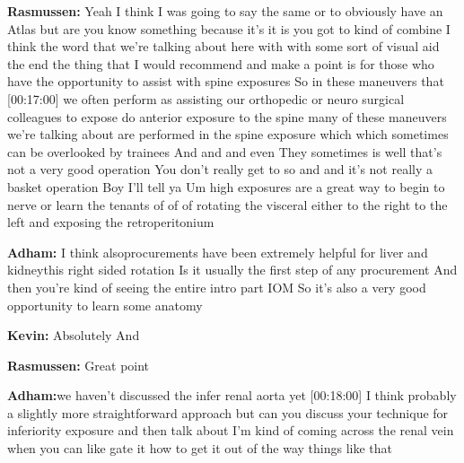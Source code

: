 \documentclass[
]{book}
\begin{document}
\textbf{Rasmussen:} Yeah I think I was going to say the same or to obviously
have an Atlas but are you know something because it's it is you got to
kind of combine I think the word that we're talking about here with with
some sort of visual aid the end the thing that I would recommend and
make a point is for those who have the opportunity to assist with spine
exposures So in these maneuvers that {[}00:17:00{]} we often perform as
assisting our orthopedic or neuro surgical colleagues to expose do
anterior exposure to the spine many of these maneuvers we're talking
about are performed in the spine exposure which which sometimes can be
overlooked by trainees And and and even They sometimes is well that's
not a very good operation You don't really get to so and and it's not
really a basket operation Boy I'll tell ya Um high exposures are a great
way to begin to nerve or learn the tenants of of of rotating the
visceral either to the right to the left and exposing the
retroperitonium

\textbf{Adham:} I think alsoprocurements have been extremely helpful for
liver and kidneythis right sided rotation Is it usually the first step
of any procurement And then you're kind of seeing the entire intro part
IOM So it's also a very good opportunity to learn some anatomy

\textbf{Kevin:} Absolutely And

\textbf{Rasmussen:} Great point

\textbf{Adham:}we haven't discussed the infer renal aorta yet {[}00:18:00{]} I
think probably a slightly more straightforward approach but can you
discuss your technique for inferiority exposure and then talk about I'm
kind of coming across the renal vein when you can like gate it how to
get it out of the way things like that
\end{document}

